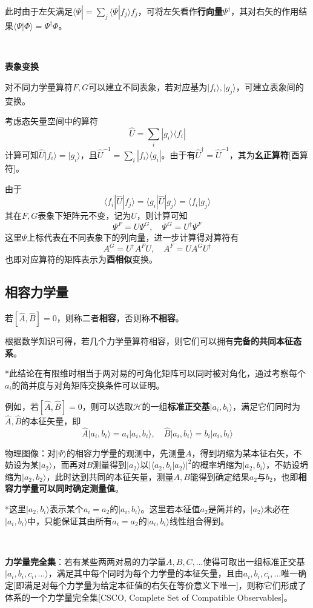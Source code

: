 \documentclass[a4paper,UTF8,fontset=windows]{ctexart}
\newcommand*{\ket}[1]{|#1\rangle}
\newcommand*{\bra}[1]{\langle#1|}
\newcommand*{\bk}[2]{\langle#1|#2\rangle}
\newcommand*{\blk}[3]{\langle#1|#2|#3\rangle}
\begin{document}
此时由于左矢满足$\bra{\Psi}=\sum_j\bk{\Psi}{f_j}{f_j}$，可将左矢看作\textbf{行向量}$\Psi^\dagger$，其对右矢的作用结果$\bk{\Psi}{\Phi}=\Psi^\dagger\Phi$。

\

\textbf{表象变换}

对不同力学量算符$F,G$可以建立不同表象，若对应基为$\ket{f_i},\ket{g_j}$，可建立表象间的变换。

考虑态矢量空间中的算符
$$\hat{U}=\sum_i\ket{g_i}\bra{f_i}$$
计算可知$\hat{U}\ket{f_i}=\ket{g_i}$，且$\hat{U}^{-1}=\sum_i\ket{f_i}\bra{g_i}$。由于有$\hat{U}^\dagger=\hat{U}^{-1}$，其为\textbf{幺正算符}[酉算符]。

由于
$$\blk{f_i}{\hat{U}}{f_j}=\blk{g_i}{\hat{U}}{g_j}=\bk{f_i}{g_j}$$
其在$F,G$表象下矩阵元不变，记为$U$，则计算可知
$$\Psi^F=U\Psi^G,\quad\Psi^G=U^\dagger\Psi^F$$
这里$\Psi$上标代表在不同表象下的列向量，进一步计算得对算符有
$$A^G=U^\dagger A^FU,\quad A^F=UA^GU^\dagger$$
也即对应算符的矩阵表示为\textbf{酉相似}变换。

\subsection{相容力学量}

若$[\hat{A},\hat{B}]=0$，则称二者\textbf{相容}，否则称\textbf{不相容}。

根据数学知识可得，若几个力学量算符相容，则它们可以拥有\textbf{完备的共同本征态系}。

*此结论在有限维时相当于两对易的可角化矩阵可以同时被对角化，通过考察每个$a_i$的简并度与对角矩阵交换条件可以证明。

例如，若$[\hat{A},\hat{B}]=0$，则可以选取$\mathcal{H}$的一组\textbf{标准正交基}$\ket{a_i,b_i}$，满足它们同时为$\hat{A},\hat{B}$的本征矢量，即
$$\hat{A}\ket{a_i,b_i}=a_i\ket{a_i,b_i},\quad\hat{B}\ket{a_i,b_i}=b_i\ket{a_i,b_i}$$

物理图像：对$\ket{\Psi}$的相容力学量的观测中，先测量$A$，得到坍缩为某本征右矢，不妨设为某$\ket{a_2}$，而再对$B$测量得到$\ket{a_2}$以$|\bk{a_2,b_i}{a_2}|^2$的概率坍缩为$\ket{a_2,b_i}$，不妨设坍缩为$\ket{a_2,b_2}$，此时达到共同的本征矢量，测量$A,B$能得到确定结果$a_2$与$b_2$，也即\textbf{相容力学量可以同时确定测量值}。

*这里$\ket{a_2,b_i}$表示某个$a_i=a_2$的$\ket{a_i,b_i}$。这里若本征值$a_2$是简并的，$\ket{a_2}$未必在$\ket{a_i,b_i}$中，只能保证其由所有$a_i=a_2$的$\ket{a_i,b_i}$线性组合得到。

\

\textbf{力学量完全集}：若有某些两两对易的力学量$A,B,C,\dots$使得可取出一组标准正交基$\ket{a_i,b_i,c_i,\dots}$，满足其中每个同时为每个力学量的本征矢量，且由$a_i,b_i,c_i,\dots$唯一确定[即满足对每个力学量为给定本征值的右矢在等价意义下唯一]，则称它们形成了体系的一个力学量完全集[CSCO, Complete Set of Compatible Observables]。
\end{document}
